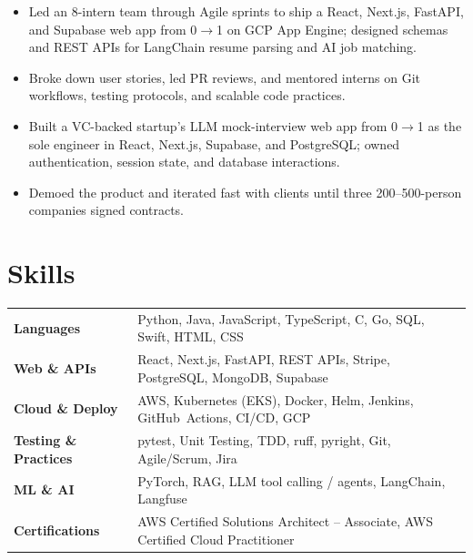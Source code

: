 \documentclass[11pt, letterpaper]{article}
\begin{document}
\vspace{1pt}
\begin{itemize}
  \item Led an 8-intern team through Agile sprints to ship a React, Next.js, FastAPI, and Supabase web app from 0$\to$1 on GCP App Engine; designed schemas and REST APIs for LangChain resume parsing and AI job matching.
  \item Broke down user stories, led PR reviews, and mentored interns on Git workflows, testing protocols, and scalable code practices.
\end{itemize}

\vspace{1pt}
\begin{itemize}
  \item Built a VC-backed startup's LLM mock-interview web app from 0$\to$1 as the sole engineer in React, Next.js, Supabase, and PostgreSQL; owned authentication, session state, and database interactions.
  \item Demoed the product and iterated fast with clients until three 200--500-person companies signed contracts.
\end{itemize}

\section{Skills}
\begin{tabularx}{\textwidth}{@{}l @{\hspace{7pt}} >{\raggedright\arraybackslash}X@{}}
  \textbf{Languages} & Python, Java, JavaScript, TypeScript, C, Go, SQL, Swift, HTML, CSS \\[1pt]
  \textbf{Web \& APIs} & React, Next.js, FastAPI, REST APIs, Stripe, PostgreSQL, MongoDB, Supabase \\[1pt]
  \textbf{Cloud \& Deploy} & AWS, Kubernetes (EKS), Docker, Helm, Jenkins, GitHub~Actions, CI/CD, GCP \\[1pt]
  \textbf{Testing \& Practices} & pytest, Unit Testing, TDD, ruff, pyright, Git, Agile/Scrum, Jira \\[1pt]
  \textbf{ML \& AI} & PyTorch, RAG, LLM tool calling / agents, LangChain, Langfuse \\[1pt]
  \textbf{Certifications} & AWS Certified Solutions Architect -- Associate, AWS Certified Cloud Practitioner \\
\end{tabularx}
\end{document}
